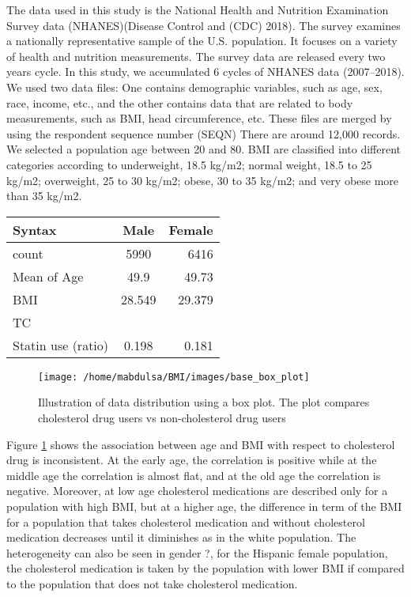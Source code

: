 \documentclass[
  12pt,
]{article}
\begin{document}
The data used in this study is the National Health and Nutrition Examination Survey data (NHANES)(Disease Control and (CDC) 2018). The survey examines a nationally representative sample of the U.S. population. It focuses on a variety of health and nutrition measurements. The survey data are released every two years cycle. In this study, we accumulated 6 cycles of NHANES data (2007--2018). We used two data files: One contains demographic variables, such as age, sex, race, income, etc., and the other contains data that are related to body measurements, such as BMI, head circumference, etc. These files are merged by using the respondent sequence number (SEQN)
There are around 12,000 records. We selected a population age between 20 and 80.
BMI are classified into different categories according to underweight, 18.5 kg/m2; normal weight, 18.5 to 25 kg/m2; overweight, 25 to 30 kg/m2; obese, 30 to 35 kg/m2; and very obese more than 35 kg/m2.

\begin{longtable}[]{@{}lcr@{}}
\toprule
Syntax & Male & Female\tabularnewline
\midrule
\endhead
count & 5990 & 6416\tabularnewline
Mean of Age & 49.9 & 49.73\tabularnewline
BMI & 28.549 & 29.379\tabularnewline
TC & &\tabularnewline
Statin use (ratio) & 0.198 & 0.181\tabularnewline
\bottomrule
\end{longtable}

\begin{figure}

{\centering \texttt{[image: /home/mabdulsa/BMI/images/base\_box\_plot]} 

}

\caption{Illustration of data distribution using a box plot. The plot compares cholesterol drug users vs non-cholesterol drug users}\label{fig:box}
\end{figure}

Figure \ref{fig:box} shows the association between age and BMI with respect to cholesterol drug is inconsistent. At the early age, the correlation is positive while at the middle age the correlation is almost flat, and at the old age the correlation is negative. Moreover, at low age cholesterol medications are described only for a population with high BMI, but at a higher age, the difference in term of the BMI for a population that takes cholesterol medication and without cholesterol medication decreases until it diminishes as in the white population. The heterogeneity can also be seen in gender ?, for the Hispanic female population, the cholesterol medication is taken by the population with lower BMI if compared to the population that does not take cholesterol medication.
\end{document}
